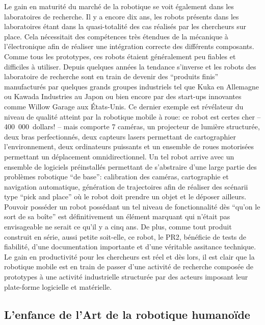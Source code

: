 Le gain en maturité du marché de la robotique se voit également dans
les laboratoires de recherche. Il y a encore dix ans, les robots
présents dans les laboratoires étant dans la quasi-totalité des cas
réalisés par les chercheurs sur place. Cela nécessitait des
compétences très étendues de la mécanique à l'électronique afin de
réaliser une intégration correcte des différents composants. Comme
tous les prototypes, ces robots étaient généralement peu fiables et
difficiles à utiliser. Depuis quelques années la tendance s'inverse et
les robots des laboratoire de recherche sont en train de devenir des
``produits finis'' manufacturés par quelques grands groupes
industriels tel que Kuka en Allemagne ou Kawada Industries au Japon ou
bien encore par des start-ups innovantes comme Willow Garage aux
États-Unis. Ce dernier exemple est révélateur du niveau de qualité
atteint par la robotique mobile à roue: ce robot est certes cher --
400 000 dollars! -- mais comporte 7 caméras, un projecteur de lumière
structurée, deux bras perfectionnés, deux capteurs lasers permettant
de cartographier l'environnement, deux ordinateurs puissants et un
ensemble de roues motorisées permettant un déplacement
omnidirectionnel. Un tel robot arrive avec un ensemble de logiciels
préinstallés permettant de s'abstraire d'une large partie des
problèmes robotique ``de base'': calibration des caméras, cartographie
et navigation automatique, génération de trajectoires afin de réaliser
des scénarii type ``pick and place'' où le robot doit prendre un objet
et le déposer ailleurs. Pouvoir posséder un robot possédant un tel
niveau de fonctionnalité dès ``qu'on le sort de sa boîte'' est
définitivement un élément marquant qui n'était pas envisageable ne
serait ce qu'il y a cinq ans. De plus, comme tout produit construit en
série, aussi petite soit-elle, ce robot, le PR2, bénéficie de tests de
fiabilité, d'une documentation importante et d'une véritable assitance
technique. Le gain en productivité pour les chercheurs est réel et dès
lors, il est clair que la robotique mobile est en train de passer
d'une activité de recherche composée de prototypes à une activité
industrielle structurée par des acteurs imposant leur plate-forme
logicielle et matérielle.



\subsection{L'enfance de l'Art de la robotique humanoïde}


